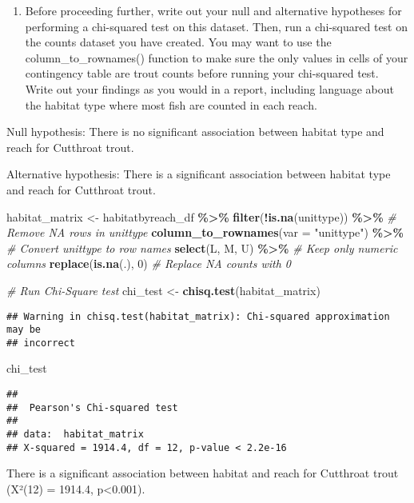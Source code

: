 \documentclass[
]{article}
\newenvironment{Shaded}{\begin{snugshade}}{\end{snugshade}}
\newcommand{\AttributeTok}[1]{\textcolor[rgb]{0.13,0.29,0.53}{#1}}
\newcommand{\CommentTok}[1]{\textcolor[rgb]{0.56,0.35,0.01}{\textit{#1}}}
\newcommand{\DecValTok}[1]{\textcolor[rgb]{0.00,0.00,0.81}{#1}}
\newcommand{\FunctionTok}[1]{\textcolor[rgb]{0.13,0.29,0.53}{\textbf{#1}}}
\newcommand{\NormalTok}[1]{#1}
\newcommand{\OtherTok}[1]{\textcolor[rgb]{0.56,0.35,0.01}{#1}}
\newcommand{\SpecialCharTok}[1]{\textcolor[rgb]{0.81,0.36,0.00}{\textbf{#1}}}
\newcommand{\StringTok}[1]{\textcolor[rgb]{0.31,0.60,0.02}{#1}}
\providecommand{\tightlist}{%
  \setlength{\itemsep}{0pt}\setlength{\parskip}{0pt}}
\begin{document}
\begin{enumerate}
\def\labelenumi{\alph{enumi}.}
\setcounter{enumi}{1}
\tightlist
\item
  Before proceeding further, write out your null and alternative
  hypotheses for performing a chi-squared test on this dataset. Then,
  run a chi-squared test on the counts dataset you have created. You may
  want to use the column\_to\_rownames() function to make sure the only
  values in cells of your contingency table are trout counts before
  running your chi-squared test. Write out your findings as you would in
  a report, including language about the habitat type where most fish
  are counted in each reach.
\end{enumerate}

Null hypothesis: There is no significant association between habitat
type and reach for Cutthroat trout.

Alternative hypothesis: There is a significant association between
habitat type and reach for Cutthroat trout.

\begin{Shaded}
\begin{Highlighting}[]
\NormalTok{habitat\_matrix }\OtherTok{\textless{}{-}}\NormalTok{ habitatbyreach\_df }\SpecialCharTok{\%\textgreater{}\%}
  \FunctionTok{filter}\NormalTok{(}\SpecialCharTok{!}\FunctionTok{is.na}\NormalTok{(unittype)) }\SpecialCharTok{\%\textgreater{}\%}  \CommentTok{\# Remove NA rows in unittype}
  \FunctionTok{column\_to\_rownames}\NormalTok{(}\AttributeTok{var =} \StringTok{"unittype"}\NormalTok{) }\SpecialCharTok{\%\textgreater{}\%}  \CommentTok{\# Convert unittype to row names}
  \FunctionTok{select}\NormalTok{(L, M, U) }\SpecialCharTok{\%\textgreater{}\%}  \CommentTok{\# Keep only numeric columns}
  \FunctionTok{replace}\NormalTok{(}\FunctionTok{is.na}\NormalTok{(.), }\DecValTok{0}\NormalTok{)  }\CommentTok{\# Replace NA counts with 0}

\CommentTok{\# Run Chi{-}Square test}
\NormalTok{chi\_test }\OtherTok{\textless{}{-}} \FunctionTok{chisq.test}\NormalTok{(habitat\_matrix)}
\end{Highlighting}
\end{Shaded}

\begin{verbatim}
## Warning in chisq.test(habitat_matrix): Chi-squared approximation may be
## incorrect
\end{verbatim}

\begin{Shaded}
\begin{Highlighting}[]
\NormalTok{chi\_test}
\end{Highlighting}
\end{Shaded}

\begin{verbatim}
## 
##  Pearson's Chi-squared test
## 
## data:  habitat_matrix
## X-squared = 1914.4, df = 12, p-value < 2.2e-16
\end{verbatim}

There is a significant association between habitat and reach for
Cutthroat trout (X²(12) = 1914.4, p\textless0.001).
\end{document}
